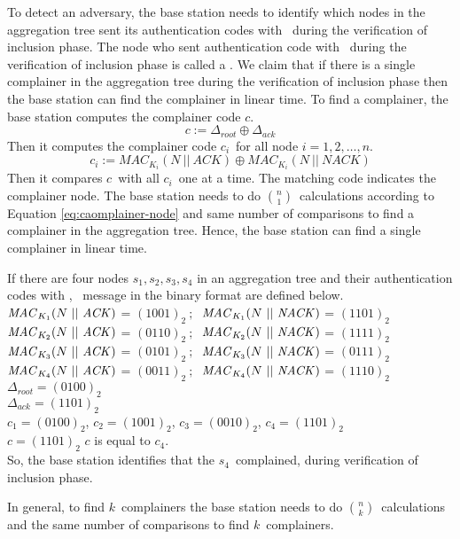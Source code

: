 	To detect an adversary, the base station needs to identify which nodes in the aggregation tree sent its authentication codes with \nack\ during the verification of inclusion phase.
	The node who sent authentication code with \nack\ during the verification of inclusion phase is called a \complainer. 
	We claim that if there is a single complainer in the aggregation tree during the verification of inclusion phase then the base station can find the complainer in linear time.
	To find a complainer, the base station computes the complainer code $c$.
	\begin{equation}\label{eq:complainer}
		c := \Delta_{root} \oplus \Delta_{ack}
	\end{equation}
	Then it computes the complainer code $c_{i}$\ for all node $i = 1, 2, \dotsc, n$. 
	\begin{equation}\label{eq:caomplainer-node}
		c_{i} := MAC_{K_{i}}(N\ ||\ \textit{ACK}) \oplus MAC_{K_{i}}(N\ ||\ \textit{NACK})
	\end{equation}
	Then it compares $c$\ with all $c_{i}$\ one at a time. 
	The matching code indicates the complainer node.
	The base station needs to do $n \choose 1$\ calculations according to Equation \ref{eq:caomplainer-node} and same number of comparisons to find a complainer in the aggregation tree. 
	Hence, the base station can find a single complainer in linear time.
	\begin{exmp} If there are four nodes ${s_{1},s_{2},s_{3},s_{4}}$ in an aggregation tree and their authentication codes with \ack, \nack\ message in the binary format are defined below.\\
		$\mac_{K_{1}}(N\ ||\ \ack)$ = $(1001)_{2}\ ;\ $
		$\mac_{K_{1}}(N\ ||\ \nack)$ = $(1101)_{2}$\\
		$\mac_{K_{2}}(N\ ||\ \ack)$ = $(0110)_{2}\ ;\ $
		$\mac_{K_{2}}(N\ ||\ \nack)$ = $(1111)_{2}$\\	
		$\mac_{K_{3}}(N\ ||\ \ack)$ = $(0101)_{2}\ ;\ $
		$\mac_{K_{3}}(N\ ||\ \nack)$ = $(0111)_{2}$\\
		$\mac_{K_{4}}(N\ ||\ \ack)$ = $(0011)_{2}\ ;\ $
		$\mac_{K_{4}}(N\ ||\ \nack)$ = $(1110)_{2}$\\
		$\Delta_{root} = (0100)_{2}$\\
		$\Delta_{ack} = (1101)_{2}$\\
		$c_{1} = (0100)_{2}$, $c_{2} = (1001)_{2}$, $c_{3} = (0010)_{2}$, $c_{4} = (1101)_{2}$\ \\
		$c = (1101)_{2}$
		$c$ is equal to $c_{4}.$\\
		So, the base station identifies that the $s_{4}$\ complained, during verification of inclusion phase.\\ 
	\end{exmp}
	In general, to find $k$\ complainers the base station needs to do $ n \choose k$\ calculations and the same number of comparisons to find $k$\ complainers.
	
